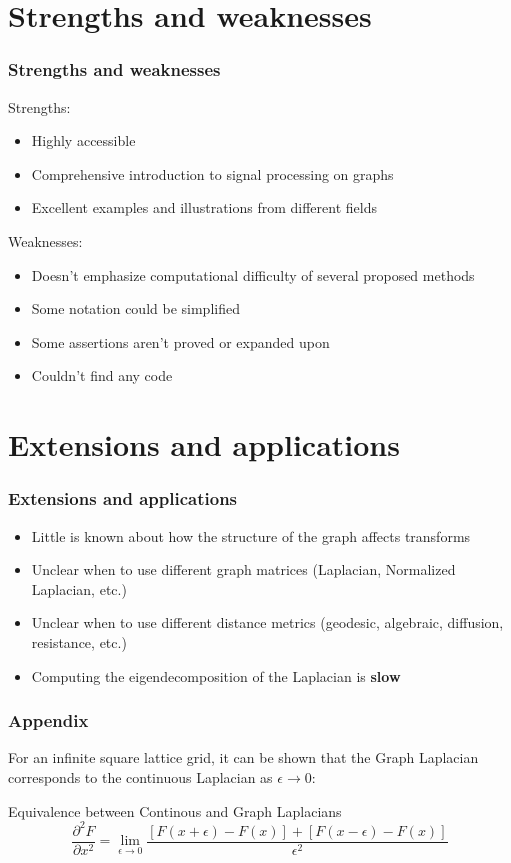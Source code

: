 \documentclass{beamer}
\begin{document}
\section{Strengths and weaknesses}

\begin{frame}
  \frametitle{Strengths and weaknesses}
  Strengths:

  \begin{itemize}
  \item Highly accessible
  \item Comprehensive introduction to signal processing on graphs
  \item Excellent examples and illustrations from different fields
  \end{itemize}

  Weaknesses:

  \begin{itemize}
  \item Doesn't emphasize computational difficulty of several proposed methods
  \item Some notation could be simplified
  \item Some assertions aren't proved or expanded upon
  \item Couldn't find any code
  \end{itemize}
\end{frame}
\section{Extensions and applications}

\begin{frame}
  \frametitle{Extensions and applications}
  \begin{itemize}
    \item Little is known about how the structure of the graph affects transforms
    \item Unclear when to use different graph matrices (Laplacian, Normalized
      Laplacian, etc.)
    \item Unclear when to use different distance metrics (geodesic, algebraic,
      diffusion, resistance, etc.)
    \item Computing the eigendecomposition of the Laplacian is \textbf{slow}
  \end{itemize}
\end{frame}


\begin{frame}
\frametitle{Appendix}

For an infinite square lattice grid, it can be shown that the Graph Laplacian
corresponds to the continuous Laplacian as $\epsilon \rightarrow 0$:

  \begin{block}{Equivalence between Continous and Graph Laplacians}
    \begin{equation}
      \frac{\partial^2 F}{\partial x^2} = \lim_{\epsilon \rightarrow 0} \frac{[F(x + \epsilon) - F(x)] + [F(x - \epsilon) - F(x)]}{\epsilon^2}
    \end{equation}
  \end{block}

\end{frame}
\end{document}
